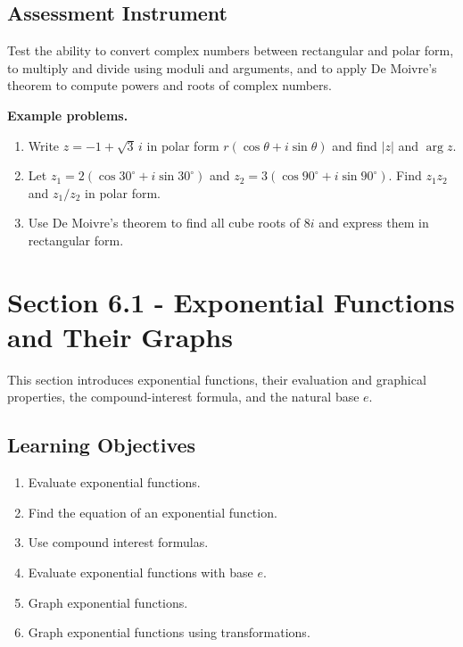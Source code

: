 \subsection{Assessment Instrument}
\label{ssec:asse-3669}

Test the ability to convert complex numbers between rectangular and polar form, to
multiply and divide using moduli and arguments, and to apply De Moivre's theorem to
compute powers and roots of complex numbers.

\textbf{Example problems.}
\begin{enumerate}
    \item Write $z = -1 + \sqrt{3}\,i$ in polar form $r(\cos\theta + i\sin\theta)$ and find $|z|$ and $\arg z$.
    \item Let $z_{1} = 2(\cos 30^{\circ} + i\sin 30^{\circ})$ and $z_{2} = 3(\cos 90^{\circ} + i\sin 90^{\circ})$. Find $z_{1}z_{2}$ and $z_{1}/z_{2}$ in polar form.
    \item Use De Moivre's theorem to find all cube roots of $8i$ and express them in rectangular form.
\end{enumerate}

\section{Section 6.1 - Exponential Functions and Their Graphs}
\label{sec:sect-6796}

This section introduces exponential functions, their evaluation and graphical properties,
the compound-interest formula, and the natural base $e$.

\subsection{Learning Objectives}
\label{ssec:lear-fe6e}

\begin{enumerate}
    \item Evaluate exponential functions.
    \item Find the equation of an exponential function.
    \item Use compound interest formulas.
    \item Evaluate exponential functions with base $e$.
    \item Graph exponential functions.
    \item Graph exponential functions using transformations.
\end{enumerate}

